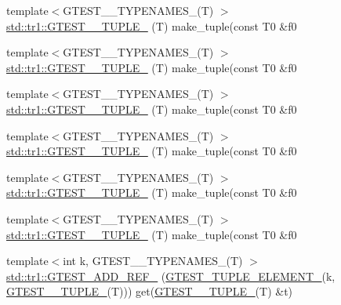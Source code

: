 \begin{DoxyCompactItemize}
\item 
{\footnotesize template$<$G\+T\+E\+S\+T\+\_\+\_\+\+T\+Y\+P\+E\+N\+A\+M\+E\+S\+\_\+(\+T) $>$ }\\\mbox{\hyperlink{namespacestd_1_1tr1_a6f8af2da768a7ea1e48b2700d1288166}{std\+::tr1\+::\+G\+T\+E\+S\+T\+\_\+\_\+\+T\+U\+P\+L\+E\+\_\+}} (T) make\+\_\+tuple(const T0 \&f0
\item 
{\footnotesize template$<$G\+T\+E\+S\+T\+\_\+\_\+\+T\+Y\+P\+E\+N\+A\+M\+E\+S\+\_\+(\+T) $>$ }\\\mbox{\hyperlink{namespacestd_1_1tr1_a31cde155977a4544af2b44b51ffe69ac}{std\+::tr1\+::\+G\+T\+E\+S\+T\+\_\+\_\+\+T\+U\+P\+L\+E\+\_\+}} (T) make\+\_\+tuple(const T0 \&f0
\item 
{\footnotesize template$<$G\+T\+E\+S\+T\+\_\+\_\+\+T\+Y\+P\+E\+N\+A\+M\+E\+S\+\_\+(\+T) $>$ }\\\mbox{\hyperlink{namespacestd_1_1tr1_a61277f5af24b20fce87a9fd94307ab34}{std\+::tr1\+::\+G\+T\+E\+S\+T\+\_\+\_\+\+T\+U\+P\+L\+E\+\_\+}} (T) make\+\_\+tuple(const T0 \&f0
\item 
{\footnotesize template$<$G\+T\+E\+S\+T\+\_\+\_\+\+T\+Y\+P\+E\+N\+A\+M\+E\+S\+\_\+(\+T) $>$ }\\\mbox{\hyperlink{namespacestd_1_1tr1_a29c8efcb79a4749e079b704c418266e6}{std\+::tr1\+::\+G\+T\+E\+S\+T\+\_\+\_\+\+T\+U\+P\+L\+E\+\_\+}} (T) make\+\_\+tuple(const T0 \&f0
\item 
{\footnotesize template$<$G\+T\+E\+S\+T\+\_\+\_\+\+T\+Y\+P\+E\+N\+A\+M\+E\+S\+\_\+(\+T) $>$ }\\\mbox{\hyperlink{namespacestd_1_1tr1_a6afad1f98814ccc897d0b02bc6fc4e7d}{std\+::tr1\+::\+G\+T\+E\+S\+T\+\_\+\_\+\+T\+U\+P\+L\+E\+\_\+}} (T) make\+\_\+tuple(const T0 \&f0
\item 
{\footnotesize template$<$G\+T\+E\+S\+T\+\_\+\_\+\+T\+Y\+P\+E\+N\+A\+M\+E\+S\+\_\+(\+T) $>$ }\\\mbox{\hyperlink{namespacestd_1_1tr1_aa636d3269bf1f368a7bc09ff158bc482}{std\+::tr1\+::\+G\+T\+E\+S\+T\+\_\+\_\+\+T\+U\+P\+L\+E\+\_\+}} (T) make\+\_\+tuple(const T0 \&f0
\item 
{\footnotesize template$<$int k, G\+T\+E\+S\+T\+\_\+\_\+\+T\+Y\+P\+E\+N\+A\+M\+E\+S\+\_\+(\+T) $>$ }\\\mbox{\hyperlink{namespacestd_1_1tr1_a495d7fb7a131317a9ba985598d3c1504}{std\+::tr1\+::\+G\+T\+E\+S\+T\+\_\+\+A\+D\+D\+\_\+\+R\+E\+F\+\_\+}} (\mbox{\hyperlink{gtest-tuple_8h_a1b7f133d8aa02e0b7afed7b66781eeb7}{G\+T\+E\+S\+T\+\_\+\+T\+U\+P\+L\+E\+\_\+\+E\+L\+E\+M\+E\+N\+T\+\_\+}}(k, \mbox{\hyperlink{gtest-tuple_8h_a275e7bcd84299cc44b9c1dba971951c4}{G\+T\+E\+S\+T\+\_\+\_\+\+T\+U\+P\+L\+E\+\_\+}}(T))) get(\mbox{\hyperlink{gtest-tuple_8h_a275e7bcd84299cc44b9c1dba971951c4}{G\+T\+E\+S\+T\+\_\+\_\+\+T\+U\+P\+L\+E\+\_\+}}(T) \&t)

\end{DoxyCompactItemize}
